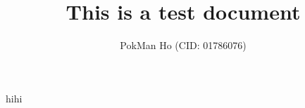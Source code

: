 \documentclass[a4paper, 11pt]{article}
\title{This is a test document}
\author{PokMan Ho (CID: 01786076)}
\date{}
\begin{document}
	\maketitle
	hihi\autocite{zwietering1994modeling}
	
	\nocite{*}\printbibliography
\end{document}
